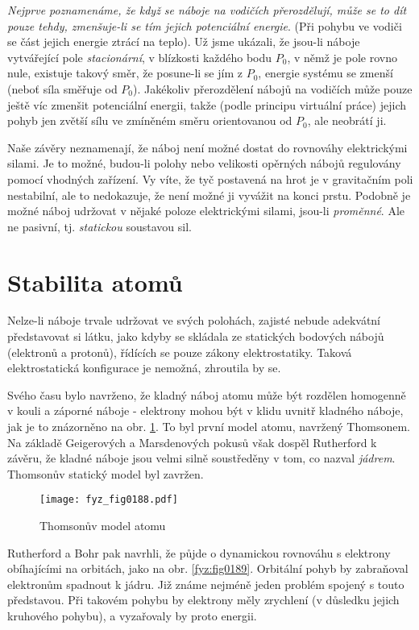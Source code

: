   \emph{Nejprve poznamenáme, že když se náboje na vodičích přerozdělují, může se to dít pouze tehdy,
  zmenšuje-li se tím jejich potenciální energie}. (Při pohybu ve vodiči se část jejich energie
  ztrácí na teplo). Už jsme ukázali, že jsou-li náboje vytvářející pole \emph{stacionární}, v
  blízkosti každého bodu \(P_0\), v němž je pole rovno nule, existuje takový směr, že posune-li se
  jím z \(P_0\), energie systému se zmenší (neboť síla směřuje od \(P_0\)). Jakékoliv přerozdělení
  nábojů na vodičích může pouze ještě víc zmenšit potenciální energii, takže (podle principu
  virtuální práce) jejich pohyb jen zvětší sílu ve zmíněném směru orientovanou od \(P_0\), ale
  neobrátí ji.
  
  Naše závěry neznamenají, že náboj není možné dostat do rovnováhy elektrickými silami. Je to možné,
  budou-li polohy nebo velikosti opěrných nábojů regulovány pomocí vhodných zařízení. Vy víte, že
  tyč postavená na hrot je v gravitačním poli nestabilní, ale to nedokazuje, že není možné ji
  vyvážit na konci prstu. Podobně je možné náboj udržovat v nějaké poloze elektrickými silami,
  jsou-li \emph{proměnné}. Ale ne pasivní, tj. \emph{statickou} soustavou sil.

\section{Stabilita atomů}\label{fyz:IIchapVsecIII}
  Nelze-li náboje trvale udržovat ve svých polohách, zajisté nebude adekvátní představovat si látku,
  jako kdyby se skládala ze statických bodových nábojů (elektronů a protonů), řídících se pouze
  zákony elektrostatiky. Taková elektrostatická konfigurace je nemožná, zhroutila by se.
  
  Svého času bylo navrženo, že kladný náboj atomu může být rozdělen homogenně v kouli a záporné
  náboje - elektrony mohou být v klidu uvnitř kladného náboje, jak je to znázorněno na obr.
  \ref{fyz:fig0188}. To byl první model atomu, navržený Thomsonem. Na základě Geigerových a
  Marsdenových pokusů však dospěl Rutherford k závěru, že kladné náboje jsou velmi silně soustředěny
  v tom, co nazval \emph{jádrem}. Thomsonův statický model byl zavržen.
  \begin{figure}[ht!] %
    \centering
    \texttt{[image: fyz\_fig0188.pdf]}
    \caption{Thomsonův model atomu}
    \label{fyz:fig0188}
  \end{figure}
  
  Rutherford a Bohr pak navrhli, že půjde o dynamickou rovnováhu s elektrony obíhajícími na 
  orbitách, jako na obr. \ref{fyz:fig0189}. Orbitální pohyb by zabraňoval 
  elektronům spadnout k jádru. Již známe nejméně jeden problém spojený s touto představou. Při 
  takovém pohybu by elektrony měly zrychlení (v důsledku jejich kruhového pohybu), a vyzařovaly 
  by proto energii.
  
